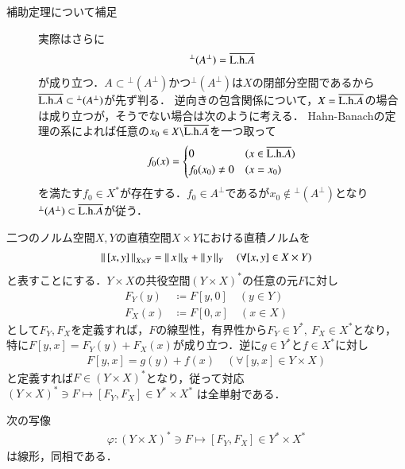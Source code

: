 	\begin{description}
		\item[補助定理について補足]
			実際はさらに
			\begin{align}
				{}^{\perp}(A^{\perp}) = \overline{\mathrm{L.h.} A}
			\end{align}
			が成り立つ．$A \subset {}^{\perp}(A^{\perp})$かつ${}^{\perp}(A^{\perp})$は$X$の閉部分空間であるから
			$\overline{\mathrm{L.h.} A} \subset {}^{\perp}(A^{\perp})$が先ず判る．
			逆向きの包含関係について，$X = \overline{\mathrm{L.h.} A}$の場合は成り立つが，そうでない場合は次のように考える．
			Hahn-Banachの定理の系によれば任意の$x_0 \in X \backslash \overline{\mathrm{L.h.} A}$を一つ取って
			\begin{align}
				f_0(x) = 
				\begin{cases}
					0 & (x \in \overline{\mathrm{L.h.} A}) \\
					f_0(x_0) \neq 0 & (x = x_0)
				\end{cases}
			\end{align}
			を満たす$f_0 \in X^*$が存在する．$f_0 \in A^{\perp}$であるが$x_0 \notin {}^{\perp}(A^{\perp})$となり
			${}^{\perp}(A^{\perp}) \subset \overline{\mathrm{L.h.} A}$が従う．
			\QED
	\end{description}
	
	二つのノルム空間$X,Y$の直積空間$X \times Y$における直積ノルムを
	\begin{align}
		\left\|\, [x,y]\, \right\|_{X \times Y} = \left\|\, x\, \right\|_{X} + \left\|\, y\, \right\|_{Y} \quad (\forall [x,y] \in X \times Y)
	\end{align}
	と表すことにする．$Y \times X$の共役空間$(Y \times X)^*$の任意の元$F$に対し
	\begin{align}
		F_Y(y) &\coloneqq F[y,0] \quad (y \in Y) \\
		F_X(x) &\coloneqq F[0,x] \quad (x \in X) \label{eq:thm_T_star_closed_1}
	\end{align}
	として$F_Y, F_X$を定義すれば，$F$の線型性，有界性から$F_Y \in Y^*,\ F_X \in X^*$となり，
	特に$F[y,x] = F_Y(y) + F_X(x)$が成り立つ．逆に$g \in Y^*$と$f \in X^*$に対し
	\begin{align}
		F[y,x] = g(y) + f(x) \quad (\forall [y,x] \in Y \times X)
	\end{align}
	と定義すれば$F \in (Y \times X)^*$となり，従って対応$(Y \times X)^* \ni F \longmapsto [F_Y,F_X] \in Y^* \times X^*$
	は全単射である．
	\begin{screen}
		\begin{lem}
			次の写像
			\begin{align}
				\varphi : (Y \times X)^* \ni F \longmapsto [F_Y,F_X] \in Y^* \times X^*
			\end{align}
			は線形，同相である．\label{lem:T_star_closed_2}
		\end{lem}
	\end{screen}
	
